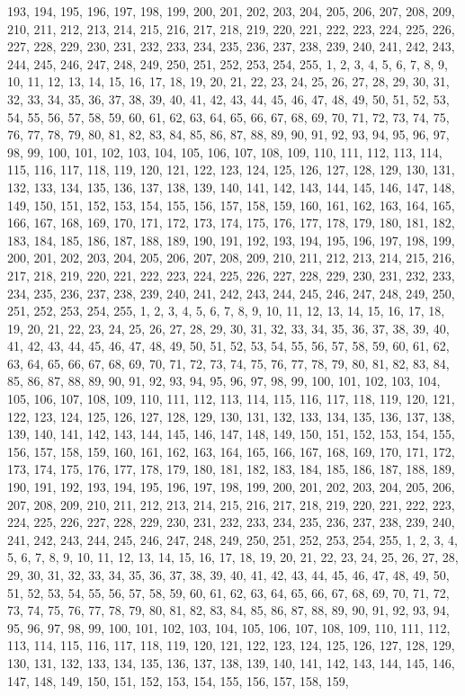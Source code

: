 193, 194, 195, 196, 197, 198, 199, 200, 201, 202, 203, 204, 205, 206, 207, 208, 209, 210, 211, 212, 213, 214, 215, 216, 217, 218, 219, 220, 221, 222, 223, 224, 225, 226, 227, 228, 229, 230, 231, 232, 233, 234, 235, 236, 237, 238, 239, 240, 241, 242, 243, 244, 245, 246, 247, 248, 249, 250, 251, 252, 253, 254, 255, 1, 2, 3, 4, 5, 6, 7, 8, 9, 10, 11, 12, 13, 14, 15, 16, 17, 18, 19, 20, 21, 22, 23, 24, 25, 26, 27, 28, 29, 30, 31, 32, 33, 34, 35, 36, 37, 38, 39, 40, 41, 42, 43, 44, 45, 46, 47, 48, 49, 50, 51, 52, 53, 54, 55, 56, 57, 58, 59, 60, 61, 62, 63, 64, 65, 66, 67, 68, 69, 70, 71, 72, 73, 74, 75, 76, 77, 78, 79, 80, 81, 82, 83, 84, 85, 86, 87, 88, 89, 90, 91, 92, 93, 94, 95, 96, 97, 98, 99, 100, 101, 102, 103, 104, 105, 106, 107, 108, 109, 110, 111, 112, 113, 114, 115, 116, 117, 118, 119, 120, 121, 122, 123, 124, 125, 126, 127, 128, 129, 130, 131, 132, 133, 134, 135, 136, 137, 138, 139, 140, 141, 142, 143, 144, 145, 146, 147, 148, 149, 150, 151, 152, 153, 154, 155, 156, 157, 158, 159, 160, 161, 162, 163, 164, 165, 166, 167, 168, 169, 170, 171, 172, 173, 174, 175, 176, 177, 178, 179, 180, 181, 182, 183, 184, 185, 186, 187, 188, 189, 190, 191, 192, 193, 194, 195, 196, 197, 198, 199, 200, 201, 202, 203, 204, 205, 206, 207, 208, 209, 210, 211, 212, 213, 214, 215, 216, 217, 218, 219, 220, 221, 222, 223, 224, 225, 226, 227, 228, 229, 230, 231, 232, 233, 234, 235, 236, 237, 238, 239, 240, 241, 242, 243, 244, 245, 246, 247, 248, 249, 250, 251, 252, 253, 254, 255, 1, 2, 3, 4, 5, 6, 7, 8, 9, 10, 11, 12, 13, 14, 15, 16, 17, 18, 19, 20, 21, 22, 23, 24, 25, 26, 27, 28, 29, 30, 31, 32, 33, 34, 35, 36, 37, 38, 39, 40, 41, 42, 43, 44, 45, 46, 47, 48, 49, 50, 51, 52, 53, 54, 55, 56, 57, 58, 59, 60, 61, 62, 63, 64, 65, 66, 67, 68, 69, 70, 71, 72, 73, 74, 75, 76, 77, 78, 79, 80, 81, 82, 83, 84, 85, 86, 87, 88, 89, 90, 91, 92, 93, 94, 95, 96, 97, 98, 99, 100, 101, 102, 103, 104, 105, 106, 107, 108, 109, 110, 111, 112, 113, 114, 115, 116, 117, 118, 119, 120, 121, 122, 123, 124, 125, 126, 127, 128, 129, 130, 131, 132, 133, 134, 135, 136, 137, 138, 139, 140, 141, 142, 143, 144, 145, 146, 147, 148, 149, 150, 151, 152, 153, 154, 155, 156, 157, 158, 159, 160, 161, 162, 163, 164, 165, 166, 167, 168, 169, 170, 171, 172, 173, 174, 175, 176, 177, 178, 179, 180, 181, 182, 183, 184, 185, 186, 187, 188, 189, 190, 191, 192, 193, 194, 195, 196, 197, 198, 199, 200, 201, 202, 203, 204, 205, 206, 207, 208, 209, 210, 211, 212, 213, 214, 215, 216, 217, 218, 219, 220, 221, 222, 223, 224, 225, 226, 227, 228, 229, 230, 231, 232, 233, 234, 235, 236, 237, 238, 239, 240, 241, 242, 243, 244, 245, 246, 247, 248, 249, 250, 251, 252, 253, 254, 255, 1, 2, 3, 4, 5, 6, 7, 8, 9, 10, 11, 12, 13, 14, 15, 16, 17, 18, 19, 20, 21, 22, 23, 24, 25, 26, 27, 28, 29, 30, 31, 32, 33, 34, 35, 36, 37, 38, 39, 40, 41, 42, 43, 44, 45, 46, 47, 48, 49, 50, 51, 52, 53, 54, 55, 56, 57, 58, 59, 60, 61, 62, 63, 64, 65, 66, 67, 68, 69, 70, 71, 72, 73, 74, 75, 76, 77, 78, 79, 80, 81, 82, 83, 84, 85, 86, 87, 88, 89, 90, 91, 92, 93, 94, 95, 96, 97, 98, 99, 100, 101, 102, 103, 104, 105, 106, 107, 108, 109, 110, 111, 112, 113, 114, 115, 116, 117, 118, 119, 120, 121, 122, 123, 124, 125, 126, 127, 128, 129, 130, 131, 132, 133, 134, 135, 136, 137, 138, 139, 140, 141, 142, 143, 144, 145, 146, 147, 148, 149, 150, 151, 152, 153, 154, 155, 156, 157, 158, 159, 